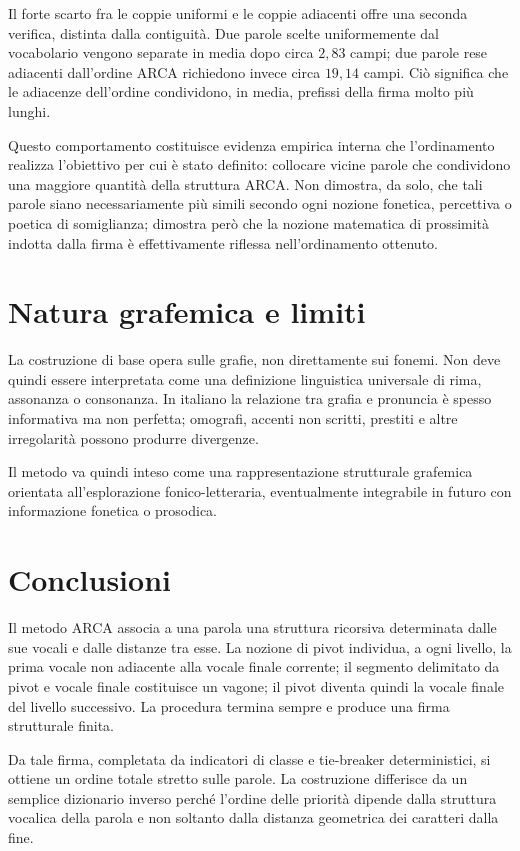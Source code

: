 \documentclass[11pt,a4paper]{article}
\theoremstyle{definition}
\theoremstyle{remark}
\begin{document}
Il forte scarto fra le coppie uniformi e le coppie adiacenti offre una seconda verifica, distinta dalla contiguità. Due parole scelte uniformemente dal vocabolario vengono separate in media dopo circa $2{,}83$ campi; due parole rese adiacenti dall'ordine ARCA richiedono invece circa $19{,}14$ campi. Ciò significa che le adiacenze dell'ordine condividono, in media, prefissi della firma molto più lunghi.

Questo comportamento costituisce evidenza empirica interna che l'ordinamento realizza l'obiettivo per cui è stato definito: collocare vicine parole che condividono una maggiore quantità della struttura ARCA. Non dimostra, da solo, che tali parole siano necessariamente più simili secondo ogni nozione fonetica, percettiva o poetica di somiglianza; dimostra però che la nozione matematica di prossimità indotta dalla firma è effettivamente riflessa nell'ordinamento ottenuto.

\section{Natura grafemica e limiti}

La costruzione di base opera sulle grafie, non direttamente sui fonemi. Non deve quindi essere interpretata come una definizione linguistica universale di rima, assonanza o consonanza. In italiano la relazione tra grafia e pronuncia è spesso informativa ma non perfetta; omografi, accenti non scritti, prestiti e altre irregolarità possono produrre divergenze.

Il metodo va quindi inteso come una rappresentazione strutturale grafemica orientata all'esplorazione fonico-letteraria, eventualmente integrabile in futuro con informazione fonetica o prosodica.

\section{Conclusioni}

Il metodo ARCA associa a una parola una struttura ricorsiva determinata dalle sue vocali e dalle distanze tra esse. La nozione di pivot individua, a ogni livello, la prima vocale non adiacente alla vocale finale corrente; il segmento delimitato da pivot e vocale finale costituisce un vagone; il pivot diventa quindi la vocale finale del livello successivo. La procedura termina sempre e produce una firma strutturale finita.

Da tale firma, completata da indicatori di classe e tie-breaker deterministici, si ottiene un ordine totale stretto sulle parole. La costruzione differisce da un semplice dizionario inverso perché l'ordine delle priorità dipende dalla struttura vocalica della parola e non soltanto dalla distanza geometrica dei caratteri dalla fine.
\end{document}
